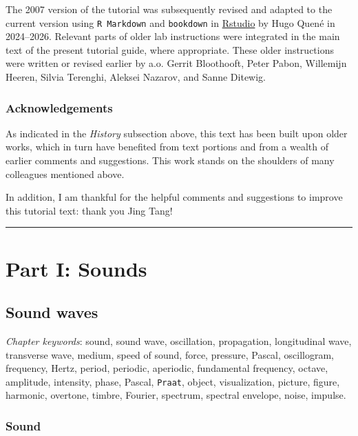 \documentclass[
]{book}
\begin{document}
The 2007 version of the tutorial was subsequently revised and adapted to the current version using \texttt{R\ Markdown} \citep{rmarkdown2018} and \texttt{bookdown} \citep{R-bookdown} in \href{https://www.rstudio.com}{Rstudio} by Hugo Quené in 2024--2026. Relevant parts of older lab instructions were integrated in the main text of the present tutorial guide, where appropriate. These older instructions were written or revised earlier by a.o. Gerrit Bloothooft, Peter Pabon, Willemijn Heeren, Silvia Terenghi, Aleksei Nazarov, and Sanne Ditewig.

\section*{Acknowledgements}\label{acknowledgements}

As indicated in the \emph{History} subsection above, this text has been built upon older works, which in turn have benefited from text portions and from a wealth of earlier comments and suggestions. This work stands on the shoulders of many colleagues mentioned above.

In addition, I am thankful for the helpful comments and suggestions to improve this tutorial text: thank you Jing Tang!

\begin{center}\rule{0.5\linewidth}{0.5pt}\end{center}

\part*{Part I: Sounds}\label{part-part-i-sounds}

\chapter{Sound waves}\label{ch-soundwaves}

\emph{Chapter keywords}: sound, sound wave, oscillation, propagation, longitudinal wave, transverse wave, medium, speed of sound, force, pressure, Pascal, oscillogram, frequency, Hertz, period, periodic, aperiodic, fundamental frequency, octave, amplitude, intensity, phase, Pascal, \texttt{Praat}, object, visualization, picture, figure, harmonic, overtone, timbre, Fourier, spectrum, spectral envelope, noise, impulse.

\section{Sound}\label{sound}
\end{document}
